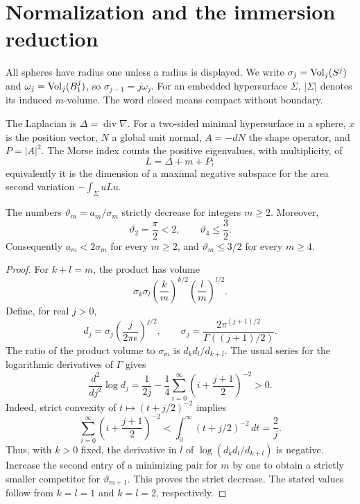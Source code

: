 \section{Normalization and the immersion reduction}
\label{sec:preliminaries}

All spheres have radius one unless a radius is displayed. We write
\(\sigma_j=\operatorname{Vol}_j(S^j)\) and \(\omega_j=\operatorname{Vol}_j(B^j_1)\), so
\(\sigma_{j-1}=j\omega_j\). For an embedded hypersurface \(\Sigma\),
\(|\Sigma|\) denotes its induced \(m\)-volume. The word closed means
compact without boundary.

The Laplacian is \(\Delta=\operatorname{div}\nabla\). For a two-sided
minimal hypersurface in a sphere, \(x\) is the position vector, \(N\) a
global unit normal, \(A=-dN\) the shape operator, and \(P=|A|^2\).
The Morse index counts the positive eigenvalues, with multiplicity, of
\[
L=\Delta+m+P;
\]
equivalently it is the dimension of a maximal negative subspace for
the area second variation \(-\int_\Sigma uLu\).

\begin{lemma}\label{lem:clifford-ratios}
The numbers \(\vartheta_m=a_m/\sigma_m\) strictly decrease for
integers \(m\ge2\). Moreover,
\[
\vartheta_2=\frac{\pi}{2}<2,
\qquad
\vartheta_4\le\frac32.
\]
Consequently \(a_m<2\sigma_m\) for every \(m\ge2\), and
\(\vartheta_m\le3/2\) for every \(m\ge4\).
\end{lemma}

\begin{proof}
For \(k+l=m\), the product has volume
\[
\sigma_k\sigma_l
\left(\frac{k}{m}\right)^{k/2}
\left(\frac{l}{m}\right)^{l/2}.
\]
Define, for real \(j>0\),
\[
d_j=\sigma_j\left(\frac{j}{2\pi e}\right)^{j/2},
\qquad
\sigma_j=\frac{2\pi^{(j+1)/2}}{\Gamma((j+1)/2)}.
\]
The ratio of the product volume to \(\sigma_m\) is \(d_kd_l/d_{k+l}\).
The usual series for the logarithmic derivatives of \(\Gamma\) gives
\[
\frac{d^2}{dj^2}\log d_j
=\frac1{2j}
-\frac14\sum_{i=0}^{\infty}
\left(i+\frac{j+1}{2}\right)^{-2}>0.
\]
Indeed, strict convexity of \(t\mapsto(t+j/2)^{-2}\) implies
\[
\sum_{i=0}^{\infty}\left(i+\frac{j+1}{2}\right)^{-2}
<
\int_0^\infty(t+j/2)^{-2}\,dt
=\frac2j.
\]
Thus, with \(k>0\) fixed, the derivative in \(l\) of
\(\log(d_kd_l/d_{k+l})\) is negative. Increase the second entry of a
minimizing pair for \(m\) by one to obtain a strictly smaller competitor
for \(\vartheta_{m+1}\). This proves the strict decrease. The stated
values follow from \(k=l=1\) and \(k=l=2\), respectively.
\end{proof}

